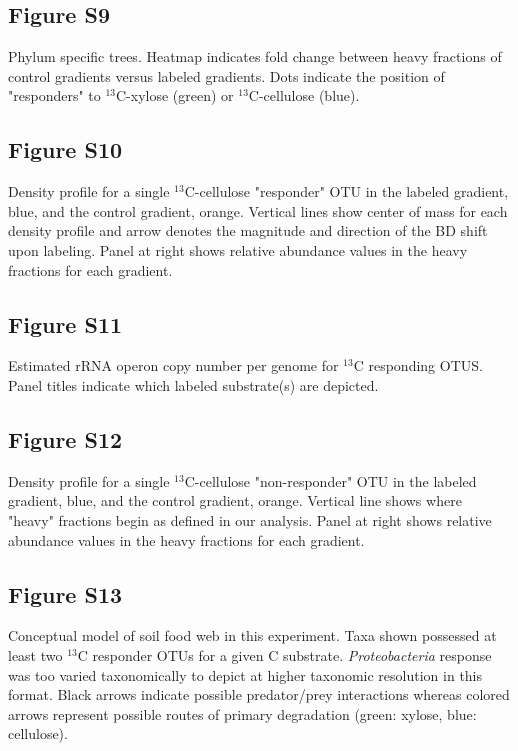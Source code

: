     \subsection{Figure S9}
Phylum specific trees. Heatmap indicates fold change between heavy fractions of control gradients versus labeled gradients. Dots indicate the position of "responders" to $^{13}$C-xylose (green) or $^{13}$C-cellulose (blue).\subsection{Figure S10}
Density profile for a single $^{13}$C-cellulose "responder" OTU in the labeled gradient, blue, and the control gradient, orange. Vertical lines show center of mass for each density profile and arrow denotes the magnitude and direction of the BD shift upon labeling. Panel at right shows relative abundance values in the heavy fractions for each gradient. \subsection{Figure S11}
Estimated rRNA operon copy number per genome for $^{13}$C responding OTUS. Panel titles indicate which labeled substrate(s) are depicted.\subsection{Figure S12}
Density profile for a single $^{13}$C-cellulose "non-responder" OTU in the labeled gradient, blue, and the control gradient, orange. Vertical line shows where "heavy" fractions begin as defined in our analysis. Panel at right shows relative abundance values in the heavy fractions for each gradient.\subsection{Figure S13}
Conceptual model of soil food web in this experiment. Taxa shown possessed at least two $^{13}$C responder OTUs for a given C substrate. \textit{Proteobacteria} response was too varied taxonomically to depict at higher taxonomic resolution in this format. Black arrows indicate possible predator/prey interactions whereas colored arrows represent possible routes of primary degradation (green: xylose, blue: cellulose).